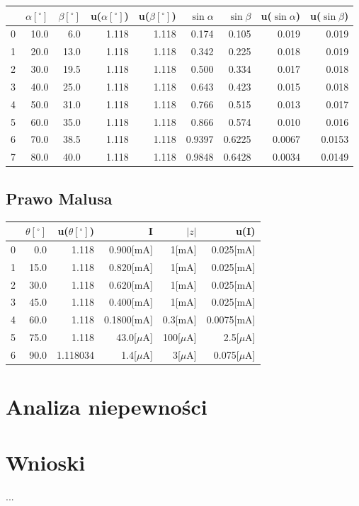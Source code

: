 \documentclass[a4paper,10pt]{article}
\begin{document}
\begin{tabular}{lrrrrrrrr}
\toprule
{}&$\alpha[^\circ]$&$\beta[^\circ]$&u($\alpha[^\circ]$)&u($\beta[^\circ]$)&$\sin{\alpha}$&$\sin{\beta}$&u($\sin{\alpha}$)&u($\sin{\beta}$) \\
\midrule
0 & 10.0 &  6.0 & 1.118 & 1.118 & 0.174 & 0.105 & 0.019 & 0.019 \\
1 & 20.0 & 13.0 & 1.118 & 1.118 & 0.342 & 0.225 & 0.018 & 0.019 \\
2 & 30.0 & 19.5 & 1.118 & 1.118 & 0.500 & 0.334 & 0.017 & 0.018 \\
3 & 40.0 & 25.0 & 1.118 & 1.118 & 0.643 & 0.423 & 0.015 & 0.018 \\
4 & 50.0 & 31.0 & 1.118 & 1.118 & 0.766 & 0.515 & 0.013 & 0.017 \\
5 & 60.0 & 35.0 & 1.118 & 1.118 & 0.866 & 0.574 & 0.010 & 0.016 \\
6 & 70.0 & 38.5 & 1.118 & 1.118 & 0.9397 & 0.6225 & 0.0067 & 0.0153 \\
7 & 80.0 & 40.0 & 1.118 & 1.118 & 0.9848 & 0.6428 & 0.0034 & 0.0149 \\
\bottomrule
\end{tabular}

\subsection{Prawo Malusa}
\begin{tabular}{lrrrrr}
\toprule
{} &$\theta[^\circ]$&u($\theta[^\circ]$)&I&$|z|$&u(I) \\
\midrule
0 &  0.0 & 1.118 & 0.900[mA] & 1[mA] & 0.025[mA] \\
1 & 15.0 & 1.118 & 0.820[mA] & 1[mA] & 0.025[mA] \\
2 & 30.0 & 1.118 & 0.620[mA] & 1[mA] & 0.025[mA] \\
3 & 45.0 & 1.118 & 0.400[mA] & 1[mA] & 0.025[mA] \\
4 & 60.0 & 1.118 & 0.1800[mA] & 0.3[mA] & 0.0075[mA] \\
5 & 75.0 & 1.118 & 43.0[$\mu$A] & 100[$\mu$A] & 2.5[$\mu$A] \\
6 &  90.0 &  1.118034 & 1.4[$\mu$A] &  3[$\mu$A] &  0.075[$\mu$A] \\
\bottomrule
\end{tabular}

\section{Analiza niepewności}

\section{Wnioski}
\paragraph{}...
\end{document}

